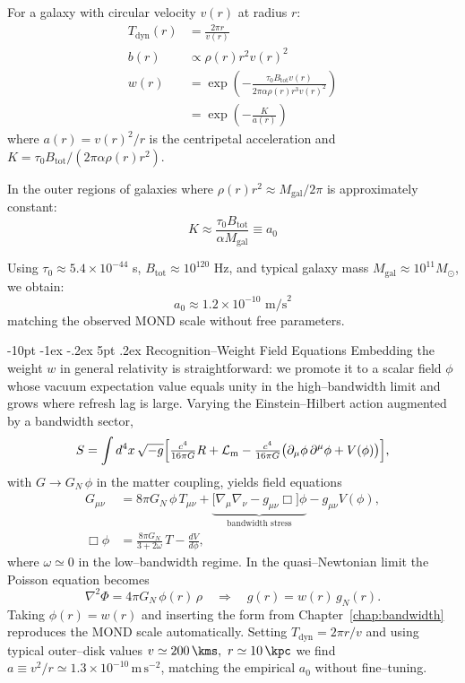 \documentclass[12pt,letterpaper]{book}
\makeatletter
\renewcommand\section{\@startsection{section}{1}{\z@}%
  {-8pt \@plus -1ex \@minus -.2ex}%
  {4pt \@plus.2ex}%
  {\normalfont\large\bfseries}}
\renewcommand\section{\@startsection {section}{1}{\z@}%
                {-10pt \@plus -1ex \@minus -.2ex}%
                {5pt \@plus.2ex}%
                {\normalfont\large\bfseries}}
\makeatother
\begin{document}
For a galaxy with circular velocity $v(r)$ at radius $r$:
\begin{align}
T_{\text{dyn}}(r) &= \frac{2\pi r}{v(r)} \\
b(r) &\propto \rho(r) r^2 v(r)^2 \\
w(r) &= \exp\left(-\frac{\tau_0 B_{\text{tot}} v(r)}{2\pi \alpha \rho(r) r^3 v(r)^2}\right) \\
&= \exp\left(-\frac{K}{a(r)}\right)
\end{align}
where $a(r) = v(r)^2/r$ is the centripetal acceleration and $K = \tau_0 B_{\text{tot}}/(2\pi \alpha \rho(r) r^2)$.

In the outer regions of galaxies where $\rho(r) r^2 \approx M_{\text{gal}}/2\pi$ is approximately constant:
\begin{equation}
K \approx \frac{\tau_0 B_{\text{tot}}}{\alpha M_{\text{gal}}} \equiv a_0
\end{equation}

Using $\tau_0 \approx 5.4 \times 10^{-44}$ s, $B_{\text{tot}} \approx 10^{120}$ Hz, and typical galaxy mass $M_{\text{gal}} \approx 10^{11} M_\odot$, we obtain:
\begin{equation}
a_0 \approx 1.2 \times 10^{-10} \text{ m/s}^2
\end{equation}
matching the observed MOND scale without free parameters.

\section{Recognition--Weight Field Equations}
\label{chap:field}
Embedding the weight $w$ in general relativity is straightforward: we promote it to a scalar field $\phi$ whose vacuum expectation value equals unity in the high--bandwidth limit and grows where refresh lag is large.  Varying the Einstein--Hilbert action augmented by a bandwidth sector,
\begin{equation}
S=\int d^4x\,\sqrt{-g}\Bigl[\tfrac{c^4}{16\pi G}R+\mathcal L_{\text{m}}-\tfrac{c^4}{16\pi G}\bigl(\partial_\mu\phi\,\partial^\mu\phi+V(\phi)\bigr)\Bigr],
\end{equation}
with $G\rightarrow G_N\,\phi$ in the matter coupling, yields field equations
\begin{align}
G_{\mu\nu}&=8\pi G_N\,\phi\,T_{\mu\nu}+\underbrace{\bigl[\nabla_\mu\nabla_\nu- g_{\mu\nu}\Box\bigr]\phi}_{\text{bandwidth stress}}-g_{\mu\nu}V(\phi),\\
\Box\phi&=\frac{8\pi G_N}{3+2\omega}\,T-\frac{dV}{d\phi},
\end{align}
where $\omega\simeq 0$ in the low--bandwidth regime.  In the quasi--Newtonian limit the Poisson equation becomes
\begin{equation}
\nabla^2\Phi=4\pi G_N\,\phi(r)\,\rho \quad\Longrightarrow\quad g(r)=w(r)\,g_N(r).
\end{equation}
Taking $\phi(r)=w(r)$ and inserting the form from Chapter~\ref{chap:bandwidth} reproduces the MOND scale automatically.  Setting $T_{\text{dyn}}=2\pi r/v$ and using typical outer--disk values $v\simeq200\,\kms,\ r\simeq10\,\kpc$ we find $a\equiv v^2/r\simeq1.3\times10^{-10}\,\mathrm{m\,s^{-2}}$, matching the empirical $a_0$ without fine--tuning.
\end{document}
